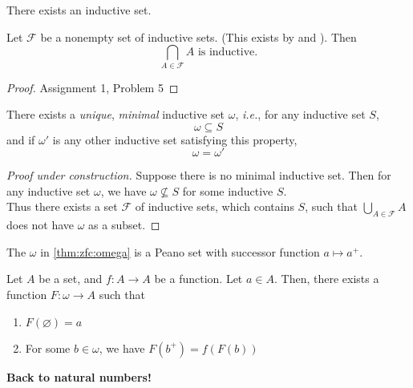\begin{axiom} \label{zfc:infinity}
    There exists an inductive set.    
\end{axiom}

\begin{lem} \label{thm:zfc:inductive_intersection}
    Let $\mathscr{F}$ be a nonempty set of inductive sets. (This exists by  and ). Then \[
        \bigcap_{A \in \mathscr{F}}{A} \text{ is inductive.}
    \]
\end{lem}
\begin{proof}
    Assignment 1, Problem 5
\end{proof}

\begin{thm} \label{thm:zfc:omega}
    There exists a \emph{unique}, \emph{minimal} inductive set $\omega$, \textit{i.e.}, for any inductive set $S$, \[
        \omega \subseteq S
    \] and if $\omega'$ is any other inductive set satisfying this property, \[
        \omega = \omega'
    \]
\end{thm}
\begin{proof}[Proof under construction]
    Suppose there is no minimal inductive set. Then for any inductive set $\omega$, we have $ \omega \not\subseteq S$ for some inductive $S$. \\
    Thus there exists a set $\mathscr{F}$ of inductive sets, which contains $S$, such that $\bigcup_{A \in \mathscr{F}} A$ does not have $\omega$ as a subset.
\end{proof}


\begin{thm} \label{thm:zfc:omega_is_peano}
    The $\omega$ in \cref{thm:zfc:omega} is a Peano set with successor function $a \mapsto a^{+}$.
\end{thm}

\begin{thm} \label{thm:zfc:recursion}
    Let $A$ be a set, and $f: A \to A$ be a function. Let $a \in A$. Then, there exists a function $F: \omega \to A$ such that
    \begin{enumerate}[label=(\alph*)]
        \item $F(\varnothing) = a$
        \item For some $b \in \omega$, we have $F(b^{+}) = f(F(b))$
    \end{enumerate}
\end{thm}

\textbf{Back to natural numbers!}
